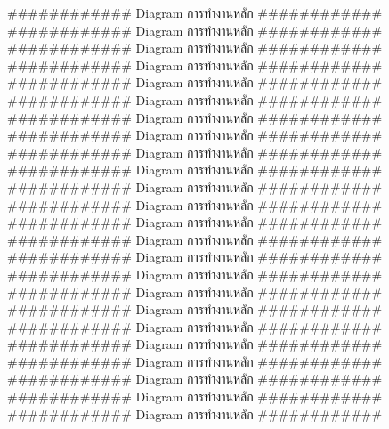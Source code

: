 ############ Diagram การทำงานหลัก ############
############ Diagram การทำงานหลัก ############
############ Diagram การทำงานหลัก ############
############ Diagram การทำงานหลัก ############
############ Diagram การทำงานหลัก ############
############ Diagram การทำงานหลัก ############
############ Diagram การทำงานหลัก ############
############ Diagram การทำงานหลัก ############
############ Diagram การทำงานหลัก ############
############ Diagram การทำงานหลัก ############
############ Diagram การทำงานหลัก ############
############ Diagram การทำงานหลัก ############
############ Diagram การทำงานหลัก ############
############ Diagram การทำงานหลัก ############
############ Diagram การทำงานหลัก ############
############ Diagram การทำงานหลัก ############
############ Diagram การทำงานหลัก ############
############ Diagram การทำงานหลัก ############
############ Diagram การทำงานหลัก ############
############ Diagram การทำงานหลัก ############
############ Diagram การทำงานหลัก ############
############ Diagram การทำงานหลัก ############
############ Diagram การทำงานหลัก ############
############ Diagram การทำงานหลัก ############
